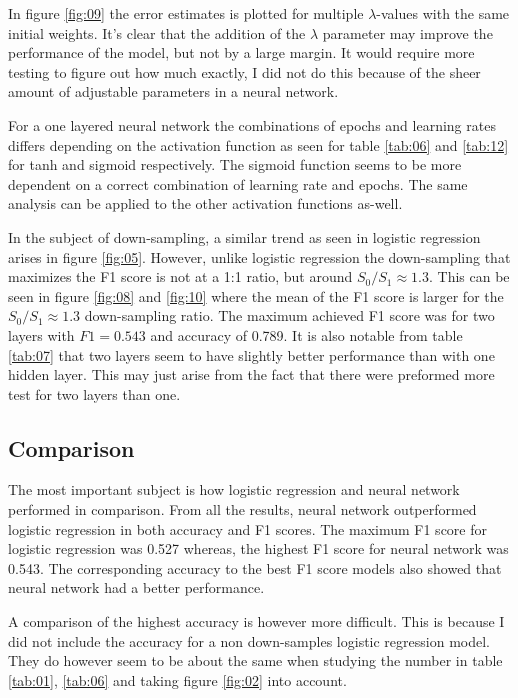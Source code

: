 \documentclass[uio,jmp,amsmath,amssymb,reprint,nofootinbib]{revtex4-1}
\numberwithin{equation}{section}
\begin{document}
In figure \ref{fig:09} the error estimates is plotted for multiple \(\lambda\)-values with the same initial weights. It's clear that the addition of the \(\lambda\) parameter may improve the performance of the model, but not by a large margin. It would require more testing to figure out how much exactly, I did not do this because of the sheer amount of adjustable parameters in a neural network.

For a one layered neural network the combinations of epochs and learning rates differs depending on the activation function as seen for table \ref{tab:06} and \ref{tab:12} for tanh and sigmoid respectively. The sigmoid function seems to be more dependent on a correct combination of learning rate and epochs. The same analysis can be applied to the other activation functions as-well.

In the subject of down-sampling, a similar trend as seen in logistic regression arises in figure \ref{fig:05}. However, unlike logistic regression the down-sampling that maximizes the F1 score is not at a 1:1 ratio, but around \(S_0/S_1 \approx 1.3\). This can be seen in figure \ref{fig:08} and \ref{fig:10} where the mean of the F1 score is larger for the \(S_0/S_1 \approx 1.3\) down-sampling ratio. The maximum achieved F1 score was for two layers with \(F1 = 0.543\) and accuracy of 0.789. It is also notable from table \ref{tab:07} that two layers seem to have slightly better performance than with one hidden layer. This may just arise from the fact that there were preformed more test for two layers than one.

\subsection{Comparison}

The most important subject is how logistic regression and neural network performed in comparison. From all the results, neural network outperformed logistic regression in both accuracy and F1 scores. The maximum F1 score for logistic regression was 0.527 whereas, the highest F1 score for neural network was 0.543. The corresponding accuracy to the best F1 score models also showed that neural network had a better performance.

A comparison of the highest accuracy is however more difficult. This is because I did not include the accuracy for a non down-samples logistic regression model. They do however seem to be about the same when studying the number in table \ref{tab:01}, \ref{tab:06} and taking figure \ref{fig:02} into account.
\end{document}
